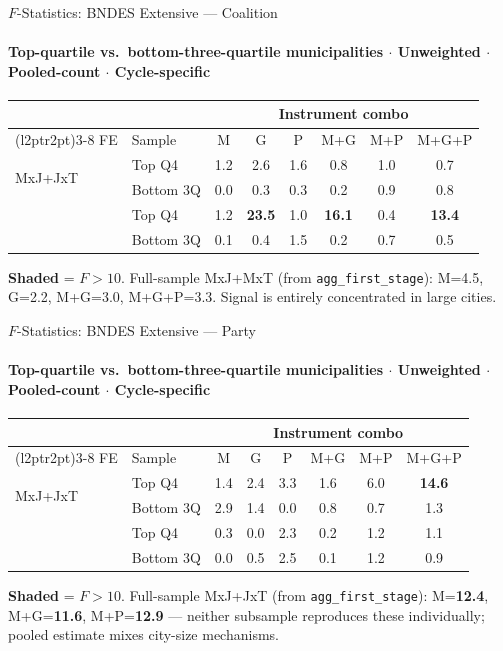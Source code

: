 \documentclass[aspectratio=169,10pt]{beamer}
\newcommand{\fpass}[1]{\cellcolor{pass}\textbf{#1}}
\begin{document}
\begin{frame}[t]{$F$-Statistics: BNDES Extensive --- Coalition}
\framesubtitle{Top-quartile vs.\ bottom-three-quartile municipalities $\cdot$ Unweighted $\cdot$ Pooled-count $\cdot$ Cycle-specific}
\begin{center}
\footnotesize
\setlength{\tabcolsep}{4pt}
\renewcommand{\arraystretch}{1.05}
\begin{tabular}{@{}llcccccc@{}}
\toprule
 & & \multicolumn{6}{c}{Instrument combo} \\
\cmidrule(l{2pt}r{2pt}){3-8}
FE & Sample & M & G & P & M+G & M+P & M+G+P \\
\midrule
\multirow{2}{*}{MxJ+JxT} & Top Q4    & 1.2 & 2.6 & 1.6 & 0.8 & 1.0 & 0.7 \\
                          & Bottom 3Q & 0.0 & 0.3 & 0.3 & 0.2 & 0.9 & 0.8 \\
\addlinespace[4pt]
\multirow{2}{*}{MxJ+MxT} & Top Q4    & 1.2 & \fpass{23.5} & 1.0 & \fpass{16.1} & 0.4 & \fpass{13.4} \\
                          & Bottom 3Q & 0.1 & 0.4           & 1.5 & 0.2           & 0.7 & 0.5           \\
\bottomrule
\end{tabular}
\end{center}
{\scriptsize \colorbox{pass}{\textbf{Shaded}} = $F>10$.
Full-sample MxJ+MxT (from \texttt{agg\_first\_stage}): M=4.5, G=2.2, M+G=3.0, M+G+P=3.3.
Signal is entirely concentrated in large cities.}
\end{frame}

\begin{frame}[t]{$F$-Statistics: BNDES Extensive --- Party}
\framesubtitle{Top-quartile vs.\ bottom-three-quartile municipalities $\cdot$ Unweighted $\cdot$ Pooled-count $\cdot$ Cycle-specific}
\begin{center}
\footnotesize
\setlength{\tabcolsep}{4pt}
\renewcommand{\arraystretch}{1.05}
\begin{tabular}{@{}llcccccc@{}}
\toprule
 & & \multicolumn{6}{c}{Instrument combo} \\
\cmidrule(l{2pt}r{2pt}){3-8}
FE & Sample & M & G & P & M+G & M+P & M+G+P \\
\midrule
\multirow{2}{*}{MxJ+JxT} & Top Q4    & 1.4 & 2.4 & 3.3 & 1.6 & 6.0 & \fpass{14.6} \\
                          & Bottom 3Q & 2.9 & 1.4 & 0.0 & 0.8 & 0.7 & 1.3           \\
\addlinespace[4pt]
\multirow{2}{*}{MxJ+MxT} & Top Q4    & 0.3 & 0.0 & 2.3 & 0.2 & 1.2 & 1.1 \\
                          & Bottom 3Q & 0.0 & 0.5 & 2.5 & 0.1 & 1.2 & 0.9 \\
\bottomrule
\end{tabular}
\end{center}
{\scriptsize \colorbox{pass}{\textbf{Shaded}} = $F>10$.
Full-sample MxJ+JxT (from \texttt{agg\_first\_stage}): M=\textbf{12.4}, M+G=\textbf{11.6}, M+P=\textbf{12.9} ---
neither subsample reproduces these individually; pooled estimate mixes city-size mechanisms.}
\end{frame}
\end{document}
